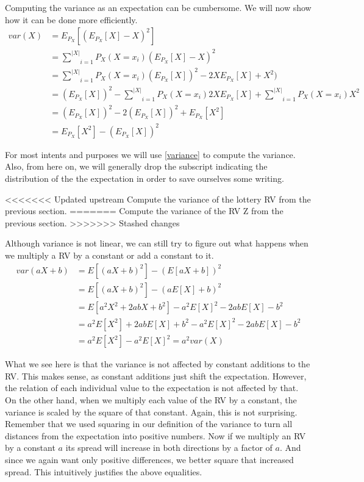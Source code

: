 \documentclass[a4paper,11pt,leqno]{report}
\begin{document}
\begin{Definition}
Computing the variance as an expectation can be cumbersome. We will now show how it can be done more efficiently.
\begin{align}
var(X) &= E_{P_{X}}[(E_{P_{X}}[X] - X)^{2}] \\
&= \underset{i = 1}{\overset{|X|}{\sum}} P_{X}(X=x_{i}) (E_{P_{X}}[X] - X)^{2} \\
&= \underset{i = 1}{\overset{|X|}{\sum}} P_{X}(X=x_{i}) (E_{P_{X}}[X])^{2} - 2XE_{P_{X}}[X] + X^{2}) \\
&= (E_{P_{X}}[X])^{2} - \underset{i = 1}{\overset{|X|}{\sum}} P_{X}(X=x_{i}) 2XE_{P_{X}}[X]
+  \underset{i = 1}{\overset{|X|}{\sum}} P_{X}(X=x_{i})  X^{2} \\
&= (E_{P_{X}}[X])^{2} -  2(E_{P_{X}}[X])^{2} +  E_{P_{X}}[X^{2}] \\
&= E_{P_{X}}[X^{2}] - (E_{P_{X}}[X])^{2} \label{variance}
\end{align}

For most intents and purposes we will use \ref{variance} to compute the variance. Also, from here on, we will generally drop the 
subscript indicating the distribution of the the expectation in order to save ourselves some writing.

\begin{Exercise}
<<<<<<< Updated upstream
Compute the variance of the lottery RV from the previous section.
=======
Compute the variance of the RV Z from the previous section.
>>>>>>> Stashed changes
\end{Exercise}

Although variance is not linear, we can still try to figure out what happens when we multiply a RV by a constant or add a constant to it.
\begin{align}
var(aX+b) &= E[(aX+b)^{2}] - (E[aX+b])^{2} \\
&= E[(aX+b)^{2}] - (aE[X]+b)^{2} \\
&= E[a^{2}X^{2} + 2abX + b^{2}] - a^{2}E[X]^{2} - 2abE[X] - b^{2} \\
&= a^{2}E[X^{2}] + 2abE[X] + b^{2} - a^{2}E[X]^{2} - 2abE[X] - b^{2} \\
&= a^{2}E[X^{2}] - a^{2}E[X]^{2} = a^{2}var(X) \
\end{align}

What we see here is that the variance is not affected by constant additions to the RV. This makes sense, as constant additions just shift
the expectation. However, the relation of each individual value to the expectation is not affected by that. On the other hand,
when we multiply each value of the RV by a constant, the variance is scaled by the square of that constant. Again, this is not surprising.
Remember that we used squaring in our definition of the variance to turn all distances from the expectation into positive numbers.
Now if we multiply an RV by a constant $ a $ its spread will increase in both directions by a factor of $ a $. 
And since we again want only positive differences,
we better square that increased spread. This intuitively justifies the above equalities.




\end{Definition}
\end{document}
